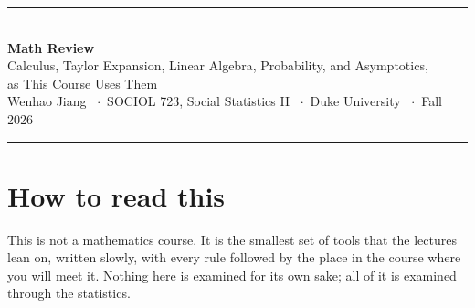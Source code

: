 \documentclass[11pt]{article}
\theoremstyle{definition}
\begin{document}
\thispagestyle{empty}
\begin{center}
{\color{dukeblue}\rule{\linewidth}{1.2pt}}\\[14pt]
{\LARGE\bfseries\color{dukeblue} Math Review}\\[8pt]
{\large Calculus, Taylor Expansion, Linear Algebra, Probability, and
Asymptotics,\\ as This Course Uses Them}\\[14pt]
{\normalsize Wenhao Jiang \ $\cdot$\ SOCIOL 723, Social Statistics II
\ $\cdot$\ Duke University \ $\cdot$\ Fall 2026}\\[10pt]
{\color{dukeblue}\rule{\linewidth}{1.2pt}}
\end{center}
\vskip 14pt

\section*{How to read this}

This is not a mathematics course. It is the smallest set of tools that the
lectures lean on, written slowly, with every rule followed by the place in
the course where you will meet it. Nothing here is examined for its own
sake; all of it is examined through the statistics.
\end{document}
